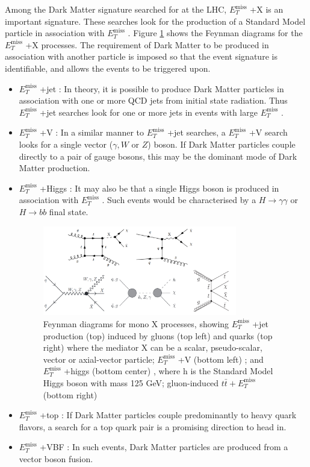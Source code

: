 \documentclass[12pt,a4paper,openright,twoside]{report}
\newcommand{\met}{$E_T^{\mathrm{miss}}$ }
\begin{document}
Among the Dark Matter signature searched for at the LHC, \met+X is an important signature. These searches look for the production of a Standard Model particle in association with \met. Figure \ref{fig:Mono_X} shows the Feynman diagrams for the \met+X processes. The requirement of Dark Matter to be produced in association with another particle is imposed so that the event signature is identifiable, and allows the events to be triggered upon.
\begin{itemize}

\item \met+jet : In theory, it is possible to produce Dark Matter particles in association with one or more QCD jets from initial state radiation. Thus \met+jet searches look for one or more jets in events with large \met.
\item \met+V : In a similar manner to \met+jet searches, a \met+V search looks for a single vector ($\gamma,W$ or $Z$) boson. If Dark Matter particles couple directly to a pair of gauge bosons, this may be the dominant mode of Dark Matter production.
\item \met+Higgs : It may also be that a single Higgs boson is produced in association with \met. Such events would be characterised by a $H\to\gamma\gamma$ or $H\to bb$ final state.
	
\begin{figure}[H]
\centering
\includegraphics[width=0.8\textwidth]{Mono_X.png}
\caption{Feynman diagrams for mono X processes, showing \met +jet production (top) induced by gluons (top left) and quarks (top right) \cite{mono_j} where the mediator X can be a scalar, pseudo-scalar, vector or axial-vector particle; \met +V (bottom left) \cite{mono_V}; and \met +higgs (bottom center) \cite{mono_h}, where h is the Standard Model Higgs boson with mass 125 GeV; gluon-induced $t\bar{t}+$\met (bottom right)}
\label{fig:Mono_X}
\end{figure}

\item \met+top : If Dark Matter particles couple predominantly to heavy quark flavors, a search for a top quark pair is a promising direction to head in.
\item \met+VBF : In such events, Dark Matter particles are produced from a vector boson fusion.
\end{itemize}
\end{document}
